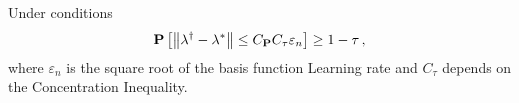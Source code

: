 \begin{theorem}
  Under conditions
  \begin{gather}
    \mathbf{P}
    \left[ 
      \left\lVert\lambda^\dagger - \lambda^*\right\rVert
      \le
      C_{\mathbf{P}}
      C_\tau
      \varepsilon_n
    \right]
    \ge
    1-\tau
    \,,
  \end{gather}
  where 
  $\varepsilon_n$ is the square root of the basis function Learning rate and $C_\tau$ depends on the Concentration Inequality.
\end{theorem}
